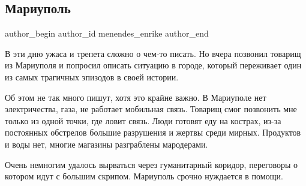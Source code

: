  
 
 
 
 
 
\subsection{Мариуполь}
\label{sec:09_03_2022.fb.menendes_enrike.1.mariupol}
 
\ifcmt
 author_begin
   author_id menendes_enrike
 author_end
\fi

В эти дню ужаса и трепета сложно о чем-то писать. Но вчера позвонил товарищ из
Мариуполя и попросил описать ситуацию в городе, который переживает один из
самых трагичных эпизодов в своей истории.

Об этом не так много пишут, хотя это крайне важно. В Мариуполе нет
электричества, газа, не работает мобильная связь. Товарищ смог позвонить мне
только из одной точки, где ловит связь. Люди готовят еду на кострах, из-за
постоянных обстрелов большие разрушения и жертвы среди мирных. Продуктов и воды
нет, многие магазины разграблены мародерами. 

Очень немногим удалось вырваться через гуманитарный коридор, переговоры о
котором идут с большим скрипом. Мариуполь срочно нуждается в помощи.
